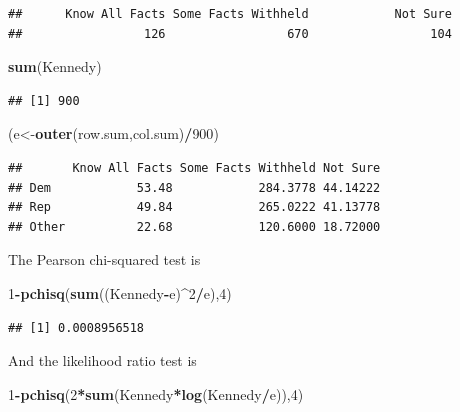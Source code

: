 \documentclass[]{book}
\newenvironment{Shaded}{\begin{snugshade}}{\end{snugshade}}
\newcommand{\KeywordTok}[1]{\textcolor[rgb]{0.13,0.29,0.53}{\textbf{#1}}}
\newcommand{\DecValTok}[1]{\textcolor[rgb]{0.00,0.00,0.81}{#1}}
\newcommand{\OperatorTok}[1]{\textcolor[rgb]{0.81,0.36,0.00}{\textbf{#1}}}
\newcommand{\NormalTok}[1]{#1}
\theoremstyle{definition}
\theoremstyle{definition}
\theoremstyle{definition}
\theoremstyle{remark}
\begin{document}
\begin{verbatim}
##      Know All Facts Some Facts Withheld            Not Sure 
##                 126                 670                 104
\end{verbatim}

\begin{Shaded}
\begin{Highlighting}[]
\KeywordTok{sum}\NormalTok{(Kennedy)}
\end{Highlighting}
\end{Shaded}

\begin{verbatim}
## [1] 900
\end{verbatim}

\begin{Shaded}
\begin{Highlighting}[]
\NormalTok{(e<-}\KeywordTok{outer}\NormalTok{(row.sum,col.sum)}\OperatorTok{/}\DecValTok{900}\NormalTok{)}
\end{Highlighting}
\end{Shaded}

\begin{verbatim}
##       Know All Facts Some Facts Withheld Not Sure
## Dem            53.48            284.3778 44.14222
## Rep            49.84            265.0222 41.13778
## Other          22.68            120.6000 18.72000
\end{verbatim}

The Pearson chi-squared test is

\begin{Shaded}
\begin{Highlighting}[]
\DecValTok{1}\OperatorTok{-}\KeywordTok{pchisq}\NormalTok{(}\KeywordTok{sum}\NormalTok{((Kennedy}\OperatorTok{-}\NormalTok{e)}\OperatorTok{^}\DecValTok{2}\OperatorTok{/}\NormalTok{e),}\DecValTok{4}\NormalTok{)}
\end{Highlighting}
\end{Shaded}

\begin{verbatim}
## [1] 0.0008956518
\end{verbatim}

And the likelihood ratio test is

\begin{Shaded}
\begin{Highlighting}[]
\DecValTok{1}\OperatorTok{-}\KeywordTok{pchisq}\NormalTok{(}\DecValTok{2}\OperatorTok{*}\KeywordTok{sum}\NormalTok{(Kennedy}\OperatorTok{*}\KeywordTok{log}\NormalTok{(Kennedy}\OperatorTok{/}\NormalTok{e)),}\DecValTok{4}\NormalTok{)}
\end{Highlighting}
\end{Shaded}
\end{document}
